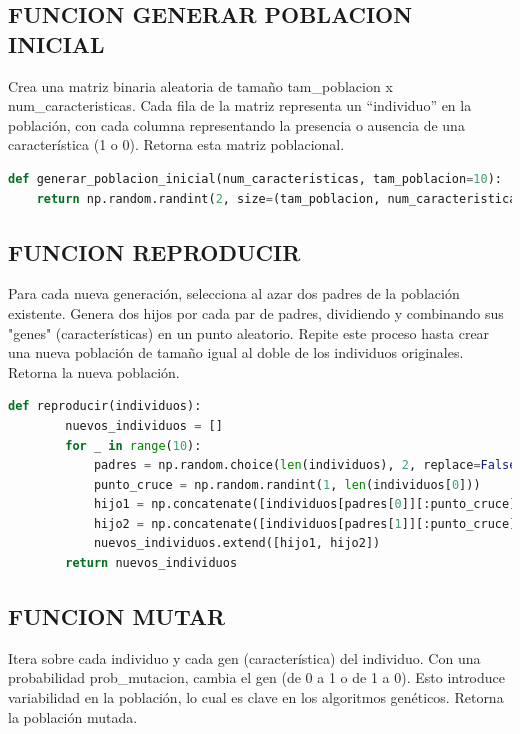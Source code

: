 \documentclass[12pt]{article}
\begin{document}
\subsection*{FUNCION GENERAR POBLACION INICIAL}

Crea una matriz binaria aleatoria de tamaño tam\_poblacion x num\_caracteristicas. Cada fila de la matriz representa un ``individuo'' en la población, con cada columna representando la presencia o ausencia de una característica (1 o 0). Retorna esta matriz poblacional. \vspace{1cm}

\begin{lstlisting}[language=Python]
def generar_poblacion_inicial(num_caracteristicas, tam_poblacion=10):
	return np.random.randint(2, size=(tam_poblacion, num_caracteristicas))
\end{lstlisting}

\subsection*{FUNCION REPRODUCIR}

Para cada nueva generación, selecciona al azar dos padres de la población existente. Genera dos hijos por cada par de padres, dividiendo y combinando sus "genes" (características) en un punto aleatorio. Repite este proceso hasta crear una nueva población de tamaño igual al doble de los individuos originales.
Retorna la nueva población. \vspace{1cm}

\begin{lstlisting}[language=Python]
	def reproducir(individuos):
		nuevos_individuos = []
		for _ in range(10): 
			padres = np.random.choice(len(individuos), 2, replace=False)
			punto_cruce = np.random.randint(1, len(individuos[0]))
			hijo1 = np.concatenate([individuos[padres[0]][:punto_cruce], individuos[padres[1]][punto_cruce:]])
			hijo2 = np.concatenate([individuos[padres[1]][:punto_cruce], individuos[padres[0]][punto_cruce:]])
			nuevos_individuos.extend([hijo1, hijo2])
		return nuevos_individuos
\end{lstlisting}


\subsection*{FUNCION MUTAR}

Itera sobre cada individuo y cada gen (característica) del individuo. Con una probabilidad prob\_mutacion, cambia el gen (de 0 a 1 o de 1 a 0). Esto introduce variabilidad en la población, lo cual es clave en los algoritmos genéticos. Retorna la población mutada. \vspace{1cm}
\end{document}
